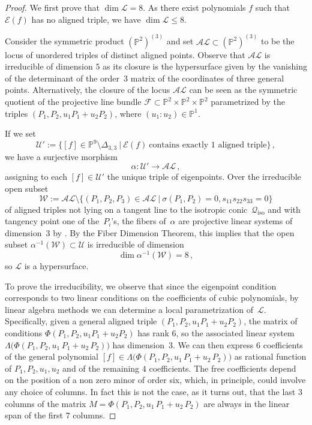 \documentclass{amsart}
\theoremstyle{plain}
\theoremstyle{definition}
\newcommand{\p}{\mathbb{P}}
\newcommand{\sL}{\mathcal{L}}
\newcommand{\sU}{\mathcal{U}}
\newcommand{\sF}{\mathcal{F}}
\newcommand{\iso}{\mathcal{Q}_{\mathrm{iso}}}
\newcommand{\Eig}[1]{\mathcal{E}\!\left( {#1} \right)}
\begin{document}
\begin{proof}
We first prove that $\dim \sL = 8$. As there exist
polynomials $f$ such that $\Eig{f}$ has no aligned triple, we have $\dim \sL \le 8$.

Consider the symmetric product $(\p^2)^{(3)}$ and set $\mathcal{AL} \subset (\p^2)^{(3)}$ to be the locus of unordered triples of distinct aligned points. Observe that $\mathcal{AL}$ is irreducible of dimension $5$ as its closure is the hypersurface given by the vanishing of the determinant of the order~$3$ matrix of the coordinates of three general points. Alternatively, the closure of the locus $\mathcal {AL}$ can be seen as the symmetric quotient of the projective line bundle $\sF \subset \p^2 \times \p^2 \times \p^2$ parametrized by the triples $(P_1, P_2, u_1 P_1 +u_2P_2)$, where $(u_1:u_2) \in \p^1$.

If we set
%
$$
  \sU':= \{[f]\in \p^9 \setminus \Delta_{3,3} \ | \ \Eig{f} \ \textrm {contains \ exactly \ $1$ \ aligned \ triple}\} \,,
$$
%
we have a surjective morphism
%
$$
  \alpha \colon \mathcal{U}' \to \mathcal{AL} \,,
$$
%
assigning to each $[f] \in \mathcal{U}'$ the unique triple of eigenpoints.
Over the irreducible open subset
%
$$
  \mathcal{W} := \mathcal{AL}
  \setminus \{(P_1,P_2,P_3) \in \mathcal{AL}
  \ | \ \sigma(P_1,P_2)=0, s_{11} s_{22} s_{33}=0\}
$$
%
of aligned triples not lying
on a tangent line to the isotropic conic~$\iso$ and with tangency point one of the~$P_i$'s, the fibers of~$\alpha$ are projective linear systems of dimension~$3$ by . 
By the Fiber Dimension Theorem, this implies that the open subset $\alpha^{-1} (\mathcal{W}) \subset \sU$ is irreducible of dimension
%
$$
  \dim \alpha ^{-1} (\mathcal{W}) = 8 \,,
$$
%
so $\sL$ is a hypersurface.

To prove the irreducibility, we observe that since the eigenpoint condition corresponds to two linear conditions on the coefficients of cubic polynomials, by linear algebra methods we can determine a local parametrization of~$\sL$.
Specifically, given a general aligned triple $(P_1, P_2, u_1 P_1 +u_2P_2)$, the matrix of conditions $\Phi(P_1, P_2, u_1 P_1 +u_2P_2)$ has rank $6$, so the associated linear system
$\Lambda \bigl( \Phi(P_1, P_2, u_1 \, P_1 + u_2 \, P_2) \bigr)$ has dimension~$3$. We can then express $6$ coefficients of the general polynomial
$[f]\in \Lambda \bigl( \Phi(P_1, P_2, u_1 \, P_1 + u_2 \, P_2) \bigr)$ as rational function of $P_1,P_2,u_1,u_2$ and of the remaining $4$ coefficients. The free coefficients depend on the position of a non zero minor of order six, which, in principle, could involve any choice of columns. In fact this is not the case, as it turns out, that the last $3$ columns of the matrix
$M = \Phi(P_1, P_2, u_1 \, P_1 + u_2 \, P_2)$ are always in the linear span of the first $7$ columns.


\end{proof}
\end{document}
